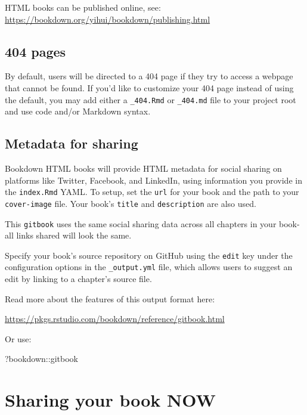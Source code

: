 \documentclass[
]{book}
\newenvironment{Shaded}{\begin{snugshade}}{\end{snugshade}}
\newcommand{\NormalTok}[1]{#1}
\newcommand{\SpecialCharTok}[1]{\textcolor[rgb]{0.00,0.00,0.00}{#1}}
\begin{document}
HTML books can be published online, see: \url{https://bookdown.org/yihui/bookdown/publishing.html}

\hypertarget{pages-1}{%
\section{404 pages}\label{pages-1}}

By default, users will be directed to a 404 page if they try to access a webpage that cannot be found. If you'd like to customize your 404 page instead of using the default, you may add either a \texttt{\_404.Rmd} or \texttt{\_404.md} file to your project root and use code and/or Markdown syntax.

\hypertarget{metadata-for-sharing-1}{%
\section{Metadata for sharing}\label{metadata-for-sharing-1}}

Bookdown HTML books will provide HTML metadata for social sharing on platforms like Twitter, Facebook, and LinkedIn, using information you provide in the \texttt{index.Rmd} YAML. To setup, set the \texttt{url} for your book and the path to your \texttt{cover-image} file. Your book's \texttt{title} and \texttt{description} are also used.

This \texttt{gitbook} uses the same social sharing data across all chapters in your book- all links shared will look the same.

Specify your book's source repository on GitHub using the \texttt{edit} key under the configuration options in the \texttt{\_output.yml} file, which allows users to suggest an edit by linking to a chapter's source file.

Read more about the features of this output format here:

\url{https://pkgs.rstudio.com/bookdown/reference/gitbook.html}

Or use:

\begin{Shaded}
\begin{Highlighting}[]
\NormalTok{?bookdown}\SpecialCharTok{::}\NormalTok{gitbook}
\end{Highlighting}
\end{Shaded}

\hypertarget{sharing-your-book-now}{%
\chapter{Sharing your book NOW}\label{sharing-your-book-now}}
\end{document}
